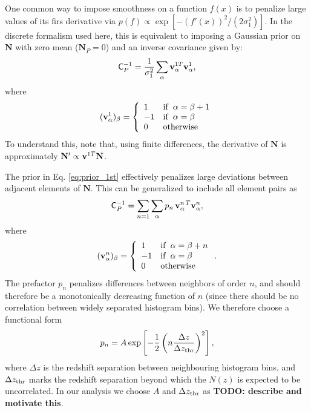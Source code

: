 \documentclass[a4paper,11pt]{article}
\newcommand{\todo}[1]{{\bf TODO: #1}}
\newcommand{\vN}{\mathbf{N}}
\begin{document}
      One common way to impose smoothness on a function $f(x)$ is to penalize large values of its firs derivative via $p(f)\propto\exp\left[-(f'(x))^2/(2\sigma_1^2)\right]$. In the discrete formalism used here, this is equivalent to imposing a Gaussian prior on $\vN$ with zero mean ($\vN_P=0$) and an inverse covariance given by:
      \begin{equation}\label{eq:prior_1st}
        {\sf C}^{-1}_P=\frac{1}{\sigma_1^2}\sum_\alpha {\bf v}^{1T}_\alpha{\bf v}^1_\alpha,
      \end{equation}
      where
      \begin{equation}
        ({\bf v}^1_\alpha)_\beta=\left\{
        \begin{array}{ll}
          1  & {\rm if}\,\,\, \alpha=\beta+1\\
          -1  &  {\rm if}\,\,\, \alpha=\beta\\
          0 & {\rm otherwise}
        \end{array}\right.
      \end{equation}
      To understand this, note that, using finite differences, the derivative of $\vN$ is approximately $\vN'\propto {\bf v}^{1T}\vN$.

      The prior in Eq. \ref{eq:prior_1st} effectively penalizes large deviations between adjacent elements of $\vN$. This can be generalized to include all element pairs as
      \begin{equation}\label{eq:smooth1}
        {\sf C}^{-1}_P=\sum_{n=1}\sum_{\alpha}p_n\,{\bf v}^{n\,T}_\alpha{\bf v}^n_\alpha,
      \end{equation}
      where
      \begin{equation}
        ({\bf v}^n_\alpha)_\beta=\left\{
        \begin{array}{ll}
          1  & {\rm if}\,\,\, \alpha=\beta+n\\
          -1  &  {\rm if}\,\,\, \alpha=\beta\\
          0 & {\rm otherwise}
        \end{array} \right..
      \end{equation}
      The prefactor $p_n$ penalizes differences between neighbors of order $n$, and should therefore be a monotonically decreasing function of $n$ (since there should be no correlation between widely separated histogram bins). We therefore choose a functional form
      \begin{equation}
        p_n=A\,{\rm exp}\left[-\frac{1}{2}\left(n\frac{\Delta z}{\Delta z_{\rm thr}}\right)^2\right],
      \end{equation}
      where $\Delta z$ is the redshift separation between neighbouring histogram bins, and $\Delta z_{\rm thr}$ marks the redshift separation beyond which the $N(z)$ is expected to be uncorrelated. In our analysis we choose $A$ and $\Delta z_{\rm thr}$ as \todo{describe and motivate this}.
      
\end{document}
